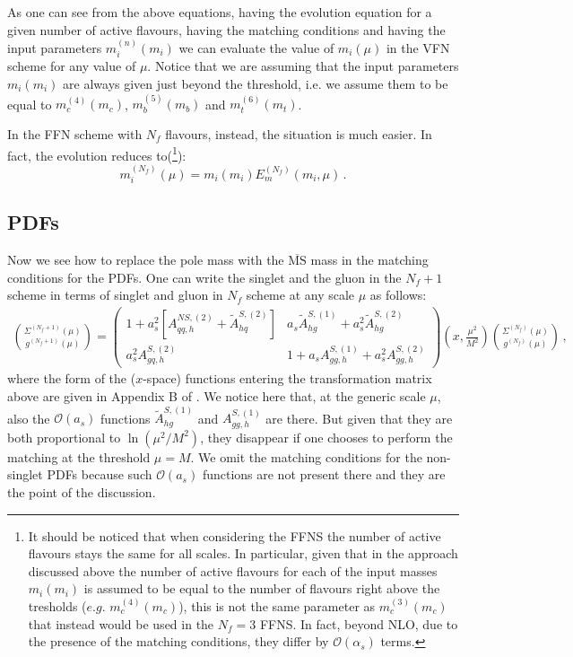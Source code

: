 \documentclass[10pt,a4paper]{article}
\begin{document}
As one can see from the above equations, having the evolution equation for a given number of active flavours, having the matching conditions and having the input parameters $m_i^{(n)}(m_i)$ we can evaluate the value of $m_i(\mu)$ in the VFN scheme for any value of $\mu$. Notice that we are assuming that the input parameters $m_i(m_i)$ are always given just beyond the threshold, i.e. we assume them to be equal to $m_c^{(4)}(m_c)$, $m_b^{(5)}(m_b)$ and $m_t^{(6)}(m_t)$. 

In the FFN scheme with $N_f$ flavours, instead, the situation is much
easier. In fact, the evolution reduces to(\footnote{It should be
  noticed that when considering the FFNS the number of active flavours
  stays the same for all scales. In particular, given that in the
  approach discussed above the number of active flavours for each of
  the input masses $m_i(m_i)$ is assumed to be equal to the number of
  flavours right above the tresholds ($e.g.$ $m_c^{(4)}(m_c)$), this
  is not the same parameter as $m_c^{(3)}(m_c)$ that instead would be
  used in the $N_f=3$ FFNS. In fact, beyond NLO, due to the presence
  of the matching conditions, they differ by $\mathcal{O}(\alpha_s)$
  terms.}):
\begin{equation}
m_i^{(N_f)}(\mu) = m_i(m_i)E_m^{(N_f)}(m_i,\mu)\,.
\end{equation} 


\subsection{PDFs}

Now we see how to replace the pole mass with the $\overline{\mbox{MS}}$ mass in the matching conditions for the PDFs. One can write the singlet and the gluon in the $N_f+1$ scheme in terms of singlet and gluon in $N_f$ scheme at any scale $\mu$ as follows:
\begin{equation}\label{couple1}
\begin{array}{c}
\displaystyle {\Sigma^{(N_f+1)}(\mu) \choose g^{(N_f+1)}(\mu)}=\begin{pmatrix}1+a_s^2[A_{qq,h}^{N\!S,(2)}+\tilde{A}^{S,(2)}_{hq}] & a_s\tilde{A}^{S,(1)}_{hg}+a_s^2\tilde{A}^{S,(2)}_{hg}\\
a_s^2A^{S,(2)}_{gq,h} & 1+a_sA_{gg,h}^{S,(1)}+a_s^2A_{gg,h}^{S,(2)}\end{pmatrix}\left(x,\frac{\mu^2}{M^2}\right){\Sigma^{(N_f)}(\mu) \choose g^{(N_f)}(\mu)}\,,
\end{array}
\end{equation}
where the form of the ($x$-space) functions entering the transformation matrix above are given in Appendix B of \cite{Buza:1996wv}. We notice here that, at the generic scale $\mu$, also the $\mathcal{O}(a_s)$ functions $\tilde{A}^{S,(1)}_{hg}$ and $A_{gg,h}^{S,(1)}$ are there. But given that they are both proportional to $\ln(\mu^2/M^2)$, they disappear if one chooses to perform the matching at the threshold $\mu=M$. We omit the matching conditions for the non-singlet PDFs because such $\mathcal{O}(a_s)$ functions are not present there and they are the point of the discussion.
\end{document}
